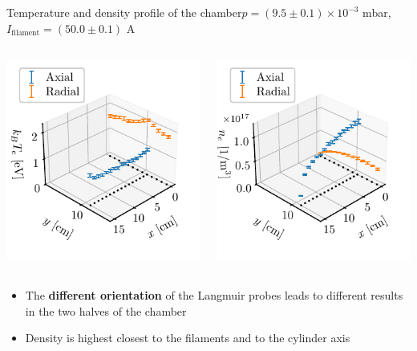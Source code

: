 \documentclass[10pt]{beamer}
\newcommand{\filamentcurrent}{\ensuremath{I_{\mathrm{filament}}}}
\begin{document}
\begin{frame}{Temperature and density profile of the chamber}{$p = (9.5 \pm 0.1) \times 10^{-3}$ mbar, $\filamentcurrent = (50.0 \pm 0.1)$ A}
    \begin{columns}
        \centering
        {\includegraphics[scale=1]{../figures/temperatureEV_profile.pdf}}
        
        \centering
        {\includegraphics[scale=1]{../figures/density_profile.pdf}}
        
    \end{columns}
    \begin{itemize}
        \item The \textbf{different orientation} of the Langmuir probes leads to different results in the two halves of the chamber
        \item Density is highest closest to the filaments and to the cylinder axis
    \end{itemize}
\end{frame}
\end{document}
